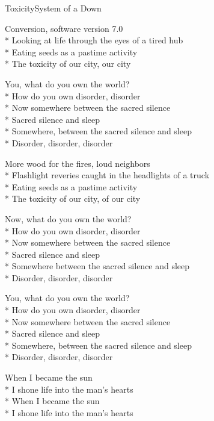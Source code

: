 \documentclass[10.5pt]{book}
\begin{document}
\begin{poem}{Toxicity}{System of a Down}

\settowidth{\versewidth}{Flashlight reveries caught in the headlights of a truck}

Conversion, software version 7.0\\*
Looking at life through the eyes of a tired hub\\*
Eating seeds as a pastime activity\\*
The toxicity of our city, our city

You, what do you own the world?\\*
How do you own disorder, disorder\\*
Now somewhere between the sacred silence\\*
Sacred silence and sleep\\*
Somewhere, between the sacred silence and sleep\\*
Disorder, disorder, disorder

More wood for the fires, loud neighbors\\*
Flashlight reveries caught in the headlights of a truck\\*
Eating seeds as a pastime activity\\*
The toxicity of our city, of our city

Now, what do you own the world?\\*
How do you own disorder, disorder\\*
Now somewhere between the sacred silence\\*
Sacred silence and sleep\\*
Somewhere between the sacred silence and sleep\\*
Disorder, disorder, disorder

You, what do you own the world?\\*
How do you own disorder, disorder\\*
Now somewhere between the sacred silence\\*
Sacred silence and sleep\\*
Somewhere, between the sacred silence and sleep\\*
Disorder, disorder, disorder

When I became the sun\\*
I shone life into the man's hearts\\*
When I became the sun\\*
I shone life into the man's hearts

\end{poem}
\end{document}

